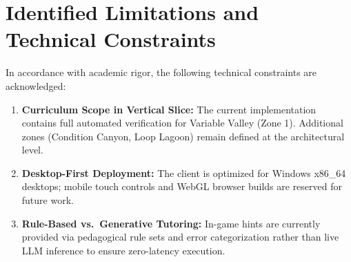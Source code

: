 \section{Identified Limitations and Technical Constraints}
In accordance with academic rigor, the following technical constraints are acknowledged:
\begin{enumerate}
    \item \textbf{Curriculum Scope in Vertical Slice:} The current implementation contains full automated verification for Variable Valley (Zone 1). Additional zones (Condition Canyon, Loop Lagoon) remain defined at the architectural level.
    \item \textbf{Desktop-First Deployment:} The client is optimized for Windows x86\_64 desktops; mobile touch controls and WebGL browser builds are reserved for future work.
    \item \textbf{Rule-Based vs.\ Generative Tutoring:} In-game hints are currently provided via pedagogical rule sets and error categorization rather than live LLM inference to ensure zero-latency execution.
\end{enumerate}
